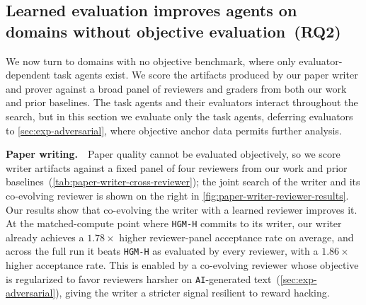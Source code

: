 \documentclass{paper}
\newcommand{\AI}{\texttt{AI}}
\newcommand{\hgmh}{\texttt{HGM-H}\xspace}
\begin{document}
\subsection{Learned evaluation improves agents on domains without objective evaluation~(RQ2)}
\label{sec:exp-writer}






We now turn to domains with no objective benchmark, where only evaluator-dependent task agents exist. We score the artifacts produced by our paper writer and prover against a broad panel of reviewers and graders from both our work and prior baselines. The task agents and their evaluators interact throughout the search, but in this section we evaluate only the task agents, deferring evaluators to \cref{sec:exp-adversarial}, where objective anchor data permits further analysis.



\noindent\textbf{Paper writing.}~~Paper quality cannot be evaluated objectively, so we score writer artifacts against a fixed panel of four reviewers from our work and prior baselines~(\cref{tab:paper-writer-cross-reviewer}); the joint search of the writer and its co-evolving reviewer is shown on the right in \cref{fig:paper-writer-reviewer-results}. Our results show that co-evolving the writer with a learned reviewer improves it. At the matched-compute point where \hgmh commits to its writer, our writer already achieves a $1.78\times$ higher reviewer-panel acceptance rate on average, and across the full run it beats \hgmh as evaluated by every reviewer, with a $1.86\times$ higher acceptance rate. This is enabled by a co-evolving reviewer whose objective is regularized to favor reviewers harsher on \AI-generated text~(\cref{sec:exp-adversarial}), giving the writer a stricter signal resilient to reward hacking.
\end{document}
